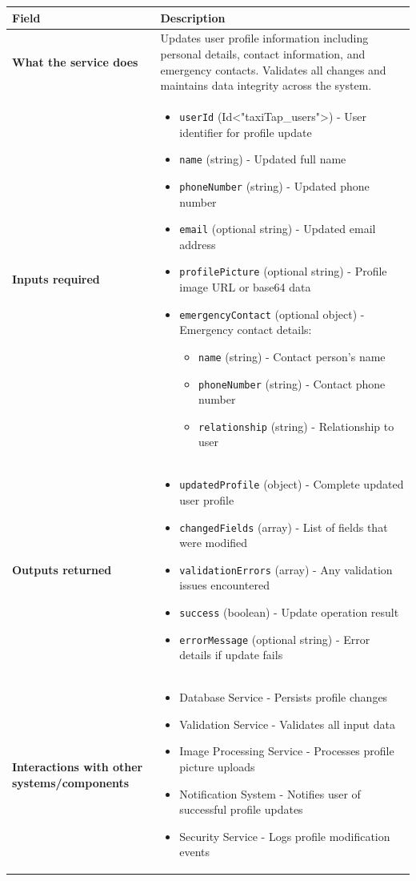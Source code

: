 \documentclass[11pt,a4paper]{article}
\begin{document}
\begin{longtable}{|p{4cm}|p{12cm}|}
\hline
\textbf{Field} & \textbf{Description} \\
\hline
\textbf{What the service does} & 
Updates user profile information including personal details, contact information, and emergency contacts. Validates all changes and maintains data integrity across the system. \\
\hline
\textbf{Inputs required} & 
\begin{itemize}[nosep]
\item \texttt{userId} (Id<"taxiTap\_users">) - User identifier for profile update
\item \texttt{name} (string) - Updated full name
\item \texttt{phoneNumber} (string) - Updated phone number
\item \texttt{email} (optional string) - Updated email address
\item \texttt{profilePicture} (optional string) - Profile image URL or base64 data
\item \texttt{emergencyContact} (optional object) - Emergency contact details:
  \begin{itemize}[nosep]
    \item \texttt{name} (string) - Contact person's name
    \item \texttt{phoneNumber} (string) - Contact phone number
    \item \texttt{relationship} (string) - Relationship to user
  \end{itemize}
\end{itemize} \\
\hline
\textbf{Outputs returned} & 
\begin{itemize}[nosep]
\item \texttt{updatedProfile} (object) - Complete updated user profile
\item \texttt{changedFields} (array) - List of fields that were modified
\item \texttt{validationErrors} (array) - Any validation issues encountered
\item \texttt{success} (boolean) - Update operation result
\item \texttt{errorMessage} (optional string) - Error details if update fails
\end{itemize} \\
\hline
\textbf{Interactions with other systems/components} & 
\begin{itemize}[nosep]
\item Database Service - Persists profile changes
\item Validation Service - Validates all input data
\item Image Processing Service - Processes profile picture uploads
\item Notification System - Notifies user of successful profile updates
\item Security Service - Logs profile modification events
\end{itemize} \\
\hline
\end{longtable}
\end{document}
